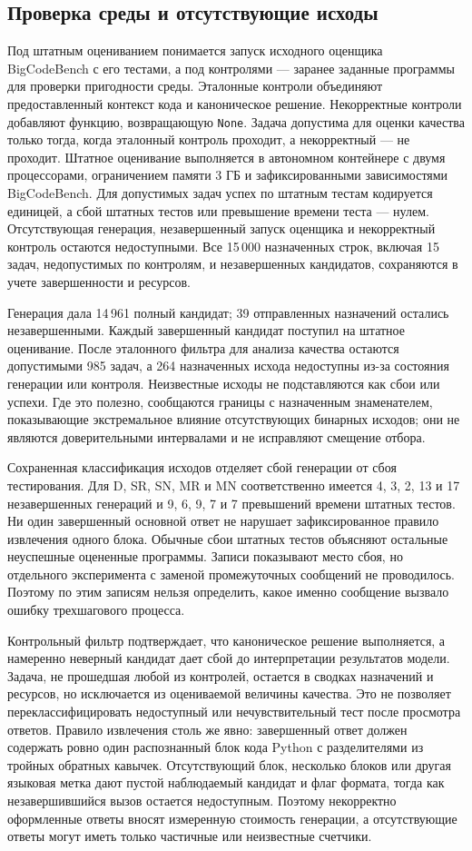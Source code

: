 \subsection{Проверка среды и отсутствующие исходы}
Под штатным оцениванием понимается запуск исходного оценщика BigCodeBench с его тестами, а под контролями --- заранее заданные программы для проверки пригодности среды. Эталонные контроли объединяют предоставленный контекст кода и каноническое решение. Некорректные контроли добавляют функцию, возвращающую \texttt{None}. Задача допустима для оценки качества только тогда, когда эталонный контроль проходит, а некорректный --- не проходит. Штатное оценивание выполняется в автономном контейнере с двумя процессорами, ограничением памяти 3 ГБ и зафиксированными зависимостями BigCodeBench. Для допустимых задач успех по штатным тестам кодируется единицей, а сбой штатных тестов или превышение времени теста --- нулем. Отсутствующая генерация, незавершенный запуск оценщика и некорректный контроль остаются недоступными. Все 15\,000 назначенных строк, включая 15 задач, недопустимых по контролям, и незавершенных кандидатов, сохраняются в учете завершенности и ресурсов.

Генерация дала 14\,961 полный кандидат; 39 отправленных назначений остались незавершенными. Каждый завершенный кандидат поступил на штатное оценивание. После эталонного фильтра для анализа качества остаются допустимыми 985 задач, а 264 назначенных исхода недоступны из-за состояния генерации или контроля. Неизвестные исходы не подставляются как сбои или успехи. Где это полезно, сообщаются границы с назначенным знаменателем, показывающие экстремальное влияние отсутствующих бинарных исходов; они не являются доверительными интервалами и не исправляют смещение отбора.

Сохраненная классификация исходов отделяет сбой генерации от сбоя тестирования. Для D, SR, SN, MR и MN соответственно имеется 4, 3, 2, 13 и 17 незавершенных генераций и 9, 6, 9, 7 и 7 превышений времени штатных тестов. Ни один завершенный основной ответ не нарушает зафиксированное правило извлечения одного блока. Обычные сбои штатных тестов объясняют остальные неуспешные оцененные программы. Записи показывают место сбоя, но отдельного эксперимента с заменой промежуточных сообщений не проводилось. Поэтому по этим записям нельзя определить, какое именно сообщение вызвало ошибку трехшагового процесса.

Контрольный фильтр подтверждает, что каноническое решение выполняется, а намеренно неверный кандидат дает сбой до интерпретации результатов модели. Задача, не прошедшая любой из контролей, остается в сводках назначений и ресурсов, но исключается из оцениваемой величины качества. Это не позволяет переклассифицировать недоступный или нечувствительный тест после просмотра ответов. Правило извлечения столь же явно: завершенный ответ должен содержать ровно один распознанный блок кода Python с разделителями из тройных обратных кавычек. Отсутствующий блок, несколько блоков или другая языковая метка дают пустой наблюдаемый кандидат и флаг формата, тогда как незавершившийся вызов остается недоступным. Поэтому некорректно оформленные ответы вносят измеренную стоимость генерации, а отсутствующие ответы могут иметь только частичные или неизвестные счетчики.

